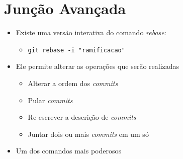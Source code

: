 \documentclass{beamer}
\newenvironment{slide}{\begin{frame}{\insertsection}}{\end{frame}}
\begin{document}
\section{Junção Avançada}
\begin{slide}
    \begin{itemize}
        \item Existe uma versão interativa do comando \emph{rebase}\pause:
        \begin{itemize}
            \item \texttt{git rebase -i "ramificacao"}
        \end{itemize}
        \pause
        \item Ele permite alterar as operações que serão realizadas
        \begin{itemize}
            \pause
            \item Alterar a ordem dos \emph{commits}
            \pause
            \item Pular \emph{commits}
            \pause
            \item Re-escrever a descrição de \emph{commits}
            \pause
            \item Juntar dois ou mais \emph{commits} em um só
        \end{itemize}
        \pause
        \item Um dos comandos mais poderosos
    \end{itemize}
\end{slide}
\end{document}
